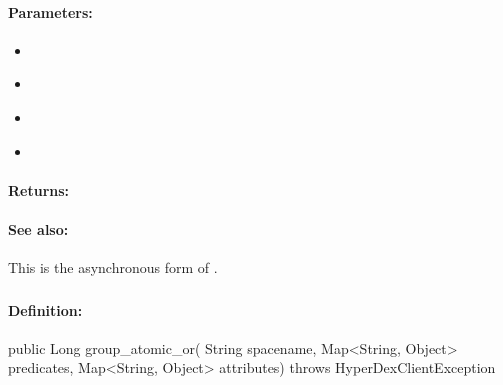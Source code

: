 \paragraph{Parameters:}
\begin{itemize}[noitemsep]
\item {}\\

\item {}\\

\item {}\\

\item {}\\

\end{itemize}

\paragraph{Returns:}


\paragraph{See also:}  This is the asynchronous form of .

\pagebreak
\subsubsection{}
\label{api:java:group_atomic_or}


\paragraph{Definition:}
\begin{javacode}
public Long group_atomic_or(
        String spacename,
        Map<String, Object> predicates,
        Map<String, Object> attributes) throws HyperDexClientException
\end{javacode}

